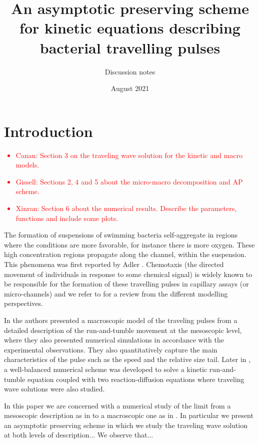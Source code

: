 \documentclass[11pt,twoside]{article}
\title{An asymptotic preserving scheme for kinetic equations describing bacterial travelling pulses}
\author{Discussion notes}
\date{August 2021}
\begin{document}
\maketitle



\section{Introduction}
\textcolor{red}{\begin{itemize}
    \item Canan: Section 3 on the traveling wave solution for the kinetic and macro models.
    \item Gissell: Sections 2, 4 and 5 about the micro-macro decomposition and AP scheme.
    \item Xinran: Section 6 about the numerical results. Describe the parameters, functions and include some plots.
\end{itemize}}


The formation of suspensions of swimming bacteria self-aggregate in regions where the conditions are more favorable, for instance there is more oxygen. These high concentration regions propagate along the channel, within the suspension. This phenomena was first reported by Adler \cite{adler1976chemotaxis}. Chemotaxis (the directed movement of individuals in response to some chemical signal) is widely known to be responsible for the formation of these travelling pulses in capillary assays (or micro-channels) and we refer to \cite{tindall2008overview} for a review from the different modelling perspectives. 

In \cite{saragosti2010mathematical} the authors presented a macroscopic model of the traveling pulses from a detailed description of the run-and-tumble movement at the mesoscopic level, where they also presented numerical simulations in accordance with the experimental observations. They also quantitatively capture the main characteristics of the pulse such as the speed and the relative size tail. Later in \cite{calvez2018well}, a well-balanced numerical scheme was developed to solve a kinetic run-and-tumble equation coupled with two reaction-diffusion equations where traveling wave solutions were also studied. 

In this paper we are concerned with a numerical study of the limit from a mesoscopic  description as in \cite{calvez2018well} to a macroscopic one as in \cite{saragosti2010mathematical}. In particular we present an asymptotic preserving scheme in which we study the traveling wave solution at both levels of description... We observe that...
\end{document}
